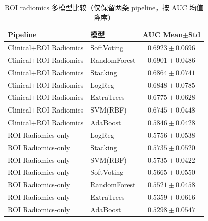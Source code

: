 \begin{table}[H]
\centering
\caption{ROI radiomics 多模型比较（仅保留两条 pipeline，按 AUC 均值降序）}
\label{tab:traditional_multimodel}
\small
\begin{tabular}{llc}
\toprule
Pipeline & 模型 & AUC Mean$\pm$Std \\
\midrule
Clinical+ROI Radiomics & SoftVoting & $0.6923\pm0.0696$ \\
Clinical+ROI Radiomics & RandomForest & $0.6901\pm0.0486$ \\
Clinical+ROI Radiomics & Stacking & $0.6864\pm0.0741$ \\
Clinical+ROI Radiomics & LogReg & $0.6848\pm0.0785$ \\
Clinical+ROI Radiomics & ExtraTrees & $0.6775\pm0.0628$ \\
Clinical+ROI Radiomics & SVM(RBF) & $0.6745\pm0.0448$ \\
Clinical+ROI Radiomics & AdaBoost & $0.5846\pm0.0428$ \\
\midrule
ROI Radiomics-only & LogReg & $0.5756\pm0.0538$ \\
ROI Radiomics-only & Stacking & $0.5735\pm0.0520$ \\
ROI Radiomics-only & SVM(RBF) & $0.5735\pm0.0422$ \\
ROI Radiomics-only & SoftVoting & $0.5665\pm0.0550$ \\
ROI Radiomics-only & RandomForest & $0.5521\pm0.0458$ \\
ROI Radiomics-only & ExtraTrees & $0.5359\pm0.0616$ \\
ROI Radiomics-only & AdaBoost & $0.5298\pm0.0547$ \\
\bottomrule
\end{tabular}
\end{table}
